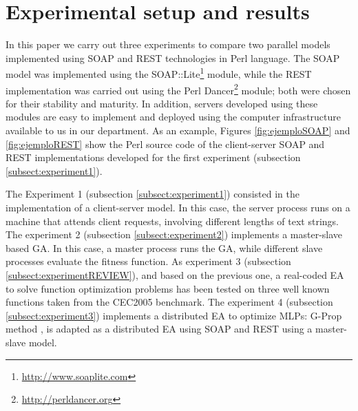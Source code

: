 \documentclass[final,1p,times]{elsarticle}
\begin{document}




\section{Experimental setup and results}
\label{sec:experimento}

In this paper we carry out three experiments to compare two parallel models implemented using SOAP and REST technologies in Perl language. %
The SOAP model was implemented using the {\sf SOAP::Lite}\footnote{\url{http://www.soaplite.com}} module,
while the REST implementation was carried out using the {\sf Perl Dancer}\footnote{\url{http://perldancer.org}} module;
both were chosen for their stability and maturity. 
In addition, servers developed using these modules are easy to implement and deployed using the computer infrastructure available to us in our department.
As an example, Figures \ref{fig:ejemploSOAP} and \ref{fig:ejemploREST} show the Perl source code of the client-server SOAP and REST implementations developed for the first experiment (subsection \ref{subsect:experiment1}).


The Experiment 1 (subsection \ref{subsect:experiment1}) consisted in the implementation of a client-server model. In this case, the server process runs on a machine that attends client requests, involving different lengths of text strings. 
The experiment 2 (subsection \ref{subsect:experiment2}) implements a master-slave based GA. In this case, a master process runs the GA, while different slave processes evaluate the fitness function.
As experiment 3 (subsection \ref{subsect:experimentREVIEW}), and based on the previous one, a real-coded EA to solve function optimization problems has been tested on three well known functions taken from the CEC2005 benchmark.
The experiment 4 (subsection \ref{subsect:experiment3}) implements a distributed EA to optimize MLPs: G-Prop method \cite{CastilloNPL},\cite{castilloNC} is adapted as a distributed EA using SOAP and REST using a master-slave model.
\end{document}
